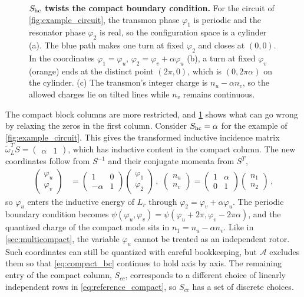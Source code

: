 \begin{figure}[t]
    \centering
    \resizebox{\linewidth}{!}{}
    \caption{{\bf $S_{\rm hc}$ twists the compact boundary condition.}
    For the circuit of \cref{fig:example_circuit}, the transmon phase $\varphi_1$ is periodic and the resonator phase $\varphi_2$ is real, so the configuration space is a cylinder (a).
    The blue path makes one turn at fixed $\varphi_2$ and closes at $(0,0)$.
    In the coordinates $\varphi_1=\varphi_u$, $\varphi_2=\varphi_v+\alpha\varphi_u$ (b), a turn at fixed $\varphi_v$ (orange) ends at the distinct point $(2\pi,0)$, which is $(0,2\pi\alpha)$ on the cylinder.
    (c) The transmon's integer charge is $n_u-\alpha n_v$, so the allowed charges lie on tilted lines while $n_v$ remains continuous.}
    \label{fig:compact_shear}
\end{figure}

The compact block columns are more restricted, and \cref{fig:compact_shear} shows what can go wrong by relaxing the zeros in the first column.
Consider $S_{\rm hc}=\alpha$ for the example of \cref{fig:example_circuit}.
This gives the transformed inductive incidence matrix $\tilde\omega_L^TS=\begin{pmatrix}\alpha&1\end{pmatrix}$, which has inductive content in the compact column.
The new coordinates follow from $S^{-1}$ and their conjugate momenta from $S^T$,
\begin{align*}
    \begin{pmatrix}\varphi_u\\\varphi_v\end{pmatrix}&=\begin{pmatrix}1&0\\-\alpha&1\end{pmatrix}\begin{pmatrix}\varphi_1\\\varphi_2\end{pmatrix}\,,\,\,
    \begin{pmatrix}n_u\\n_v\end{pmatrix}=\begin{pmatrix}1&\alpha\\0&1\end{pmatrix}\begin{pmatrix}n_1\\n_2\end{pmatrix}\,,
\end{align*}
so $\varphi_u$ enters the inductive energy of $L_r$ through $\varphi_2=\varphi_v+\alpha\varphi_u$.
The periodic boundary condition becomes $\psi(\varphi_u,\varphi_v)=\psi(\varphi_u+2\pi,\varphi_v-2\pi\alpha)$, and the quantized charge of the compact mode sits in $n_1=n_u-\alpha n_v$.
Like in \cref{sec:multicompact}, the variable $\varphi_u$ cannot be treated as an independent rotor.
Such coordinates can still be quantized with careful bookkeeping, but $\mathcal A$ excludes them so that \cref{eq:compact_bc} continues to hold axis by axis.
The remaining entry of the compact column, $S_{cc}$, corresponds to a different choice of linearly independent rows in \cref{eq:reference_compact}, so $S_{cc}$ has a set of discrete choices.

